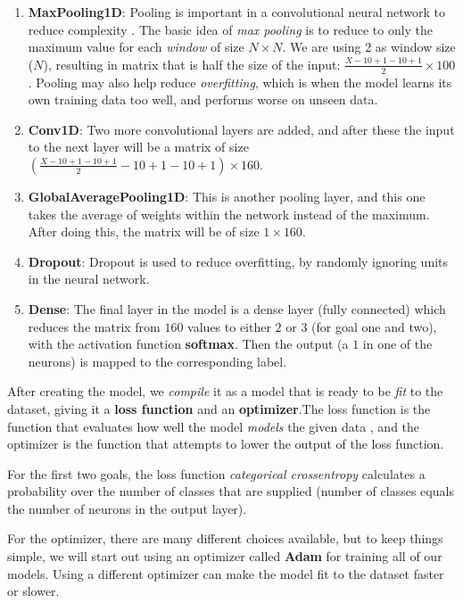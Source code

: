 \begin{enumerate}
  \item \textbf{MaxPooling1D}: Pooling is important in a convolutional neural network to reduce complexity \cite{1d_cnn}. 
        The basic idea of \textit{max pooling} is to reduce to only the maximum value for each \textit{window} of size $N \times N$. We are using 2 as 
        window size ($N$), resulting in matrix that is half the size of the input: $ \frac{X-10+1-10+1}{2} \times 100$. 
        Pooling may also help reduce \textit{overfitting}, which is when the model learns its own training data too well, and performs worse on unseen data.
  \item \textbf{Conv1D}: Two more convolutional layers are added, and after these the input to the next layer will be a matrix of size
        $ \left( \frac{X-10+1-10+1}{2}-10+1-10+1 \right) \times 160 $.
  \item \textbf{GlobalAveragePooling1D}: This is another pooling layer, and this one takes the average of weights within the network instead of the maximum.
        After doing this, the matrix will be of size $ 1 \times 160 $.
  \item \textbf{Dropout}: Dropout is used to reduce overfitting, by randomly ignoring units in the neural network. 
  \item \textbf{Dense}: The final layer in the model is a dense layer (fully connected) which reduces the matrix from $160$ values to 
        either $2$ or $3$ (for goal one and two), with the activation function \textbf{softmax}. 
        Then the output (a $1$ in one of the neurons) is mapped to the corresponding label.
        
\end{enumerate}

After creating the model, we \textit{compile} it as a model that is ready to be \textit{fit} to the dataset, 
giving it a \textbf{loss function} and an \textbf{optimizer}.The loss function is the function that evaluates how well the 
model \textit{models} the given data \cite{loss_functions}, and the optimizer is the function that attempts to lower the output of the loss function. 

For the first two goals, the loss function \textit{categorical crossentropy} calculates a probability over the 
number of classes that are supplied (number of classes equals the number of neurons in the output layer). 

For the optimizer, there are many different choices available,
but to keep things simple, we will start out using an optimizer called \textbf{Adam} for training all of our models. Using a different optimizer can make the 
model fit to the dataset faster or slower. 

